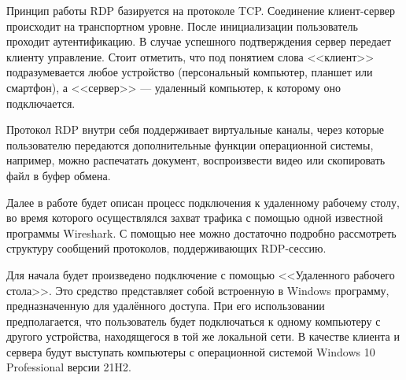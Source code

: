 \documentclass[bachelor, och, coursework]{SCWorks}
\begin{document}
  Принцип работы RDP базируется на протоколе TCP. Соединение клиент-сервер происходит на транспортном уровне. После инициализации пользователь 
  проходит аутентификацию. В случае успешного подтверждения сервер передает клиенту управление. Стоит отметить, что под понятием слова <<клиент>> подразумевается
  любое устройство (персональный компьютер, планшет или смартфон), а <<сервер>> --- удаленный компьютер, к которому оно подключается.

  Протокол RDP внутри себя поддерживает виртуальные каналы, через которые пользователю передаются дополнительные функции операционной системы,
  например, можно распечатать документ, воспроизвести видео или скопировать файл в буфер обмена.

  
  Далее в работе будет описан процесс подключения к удаленному рабочему столу, во время которого осуществлялся захват трафика с помощью одной известной программы Wireshark. 
  С помощью нее можно достаточно подробно рассмотреть структуру сообщений протоколов, поддерживающих RDP-сессию.

  Для начала будет произведено подключение с помощью <<Удаленного рабочего стола>>. Это средство представляет собой встроенную в Windows программу, предназначенную
  для удалённого доступа. При его использовании предполагается, что пользователь будет подключаться к одному компьютеру с другого устройства, находящегося в той же
  локальной сети. В качестве клиента и сервера будут выступать компьютеры с операционной системой Windows 10 Professional версии 21H2. 
  
\end{document}
